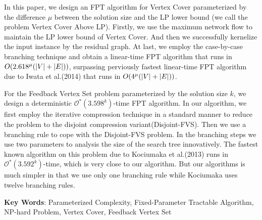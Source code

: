 In this paper, we design an FPT algorithm for Vertex Cover parameterized by the difference $\mu$ between the solution size and the LP lower bound
(we call the problem Vertex Cover Above LP).
Firstly, we use the maximum network flow to maintain the LP lower bound of Vertex Cover.
And then we successfully kernelize the input instance by the residual graph.
At last, we employ the case-by-case branching technique and obtain a linear-time FPT algorithm that runs in $O(2.618^\mu(\left\vert V \right\vert + \left\vert E \right\vert))$,
surpassing perviously fastest linear-time FPT algorithm due to Iwata et al.(2014) that runs in $O(4^\mu(\left\vert V \right\vert + \left\vert E \right\vert))$.

For the Feedback Vertex Set problem parameterized by the solution size $k$, we design a deterministic $\mathcal{O}^*(3.598^k)$-time FPT algorithm.
In our algorithm, we first employ the iterative compression technique in a standard manner to reduce the problem to the disjoint compression variant(Disjoint-FVS).
Then we use a branching rule to cope with the Disjoint-FVS problem.
In the branching steps we use two parameters to analysis the size of the search tree innovatively.
The fastest known algorithm on this problem due to Kociumaka et al.(2013) runs in $\mathcal{O}^*(3.592^k)$-time,
which is very close to our algorithm.
But our algorithms is much simpler in that we use only one branching rule while Kociumaka uses twelve branching rules.

\vspace{1cm} \noindent\textbf{Key Words}: Parameterized Complexity, Fixed-Parameter Tractable Algorithm, NP-hard Problem, Vertex Cover, Feedback Vertex Set

\restoregeometry